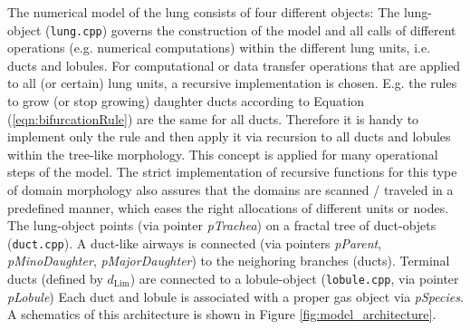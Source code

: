 The numerical model of the lung consists of four different objects: The lung-object (\texttt{lung.cpp}) governs the construction of the model and all calls of different operations (e.g. numerical computations) within the different lung units, i.e. ducts and lobules.
For computational or data transfer operations that are applied to all (or certain) lung units, a recursive implementation is chosen.
E.g. the rules to grow (or stop growing) daughter ducts according to Equation (\ref{eqn:bifurcationRule}) are the same for all ducts.
Therefore it is handy to implement only the rule and then apply it via recursion to all ducts and lobules within the tree-like morphology.
This concept is applied for many operational steps of the model.
The strict implementation of recursive functions for this type of domain morphology also assures that the domains are scanned / traveled in a predefined manner, which eases the right allocations of different units or nodes.
The lung-object points (via pointer \textit{pTrachea}) on a fractal tree of duct-objets (\texttt{duct.cpp}).
A duct-like airways is connected (via pointers \textit{pParent}, \textit{pMinoDaughter}, \textit{pMajorDaughter}) to the neighoring branches (ducts).
Terminal ducts (defined by $d_\mathrm{Lim}$) are connected to a lobule-object (\texttt{lobule.cpp}, via pointer \textit{pLobule})
Each duct and lobule is associated with a proper gas object via \textit{pSpecies}.
A schematics of this architecture is shown in Figure \ref{fig:model_architecture}.
